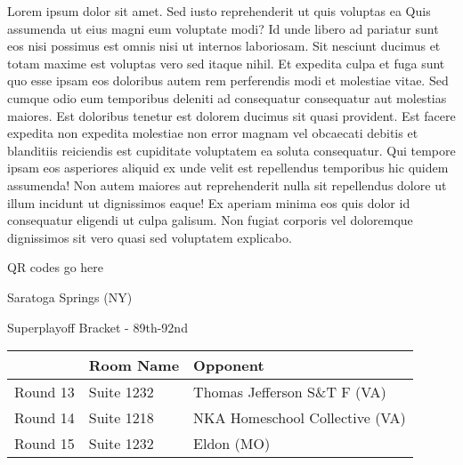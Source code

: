 \documentclass{article}%
\begin{document}
\vspace*{8pt}%
\linebreak%
\newline%
\newline%
Lorem ipsum dolor sit amet. Sed iusto reprehenderit ut quis voluptas ea Quis assumenda ut eius magni eum voluptate modi? Id unde libero ad pariatur sunt eos nisi possimus est omnis nisi ut internos laboriosam. Sit nesciunt ducimus et totam maxime est voluptas vero sed itaque nihil. Et expedita culpa et fuga sunt quo esse ipsam eos doloribus autem rem perferendis modi et molestiae vitae.\newline%
\newline%
Sed cumque odio eum temporibus deleniti ad consequatur consequatur aut molestias maiores. Est doloribus tenetur est dolorem ducimus sit quasi provident. Est facere expedita non expedita molestiae non error magnam vel obcaecati debitis et blanditiis reiciendis est cupiditate voluptatem ea soluta consequatur. Qui tempore ipsam eos asperiores aliquid ex unde velit est repellendus temporibus hic quidem assumenda!\newline%
\newline%
Non autem maiores aut reprehenderit nulla sit repellendus dolore ut illum incidunt ut dignissimos eaque! Ex aperiam minima eos quis dolor id consequatur eligendi ut culpa galisum. Non fugiat corporis vel doloremque dignissimos sit vero quasi sed voluptatem explicabo.\newline%
\newline%
%
\vspace*{30pt}%
\begin{center}%
\begin{Huge}%
QR codes go here%
\end{Huge}%
\end{center}%
\newpage%
\begin{center}%
\begin{Huge}%
Saratoga Springs (NY)%
\end{Huge}%
\vspace*{8pt}%
\linebreak%
\begin{Large}%
Superplayoff Bracket {-} 89th{-}92nd%
\end{Large}%
\end{center}%
%
\begin{tabularx}{\textwidth}{|c|Y|Y|}%
\hline%
&Room Name&Opponent\\%
\hline%
Round 13&Suite 1232&Thomas Jefferson S\&T F (VA)\\%
Round 14&Suite 1218&NKA Homeschool Collective (VA)\\%
Round 15&Suite 1232&Eldon (MO)\\%
\hline%
\end{tabularx}%
\end{document}
